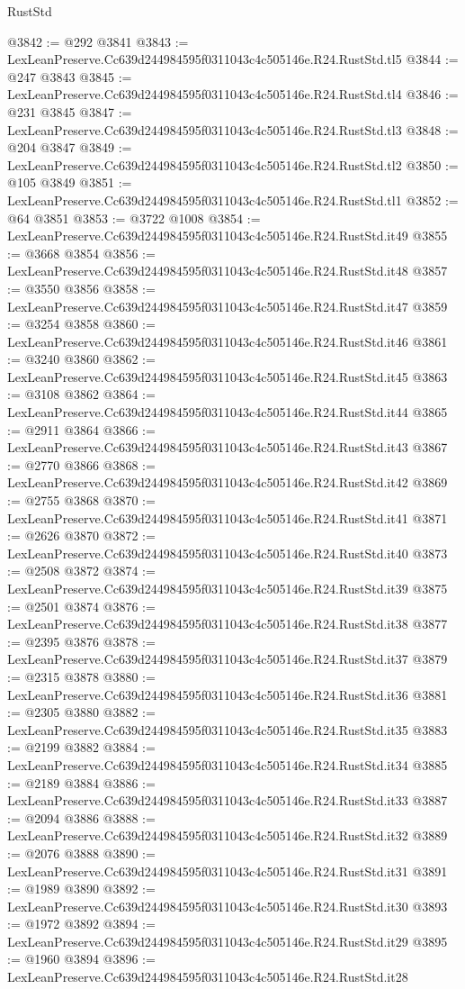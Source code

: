 \begin{lexlean}{RustStd}
\begin{coremodule}
@3842 := @292 @3841
@3843 := LexLeanPreserve.Cc639d244984595f0311043c4c505146e.R24.RustStd.tl5
@3844 := @247 @3843
@3845 := LexLeanPreserve.Cc639d244984595f0311043c4c505146e.R24.RustStd.tl4
@3846 := @231 @3845
@3847 := LexLeanPreserve.Cc639d244984595f0311043c4c505146e.R24.RustStd.tl3
@3848 := @204 @3847
@3849 := LexLeanPreserve.Cc639d244984595f0311043c4c505146e.R24.RustStd.tl2
@3850 := @105 @3849
@3851 := LexLeanPreserve.Cc639d244984595f0311043c4c505146e.R24.RustStd.tl1
@3852 := @64 @3851
@3853 := @3722 @1008
@3854 := LexLeanPreserve.Cc639d244984595f0311043c4c505146e.R24.RustStd.it49
@3855 := @3668 @3854
@3856 := LexLeanPreserve.Cc639d244984595f0311043c4c505146e.R24.RustStd.it48
@3857 := @3550 @3856
@3858 := LexLeanPreserve.Cc639d244984595f0311043c4c505146e.R24.RustStd.it47
@3859 := @3254 @3858
@3860 := LexLeanPreserve.Cc639d244984595f0311043c4c505146e.R24.RustStd.it46
@3861 := @3240 @3860
@3862 := LexLeanPreserve.Cc639d244984595f0311043c4c505146e.R24.RustStd.it45
@3863 := @3108 @3862
@3864 := LexLeanPreserve.Cc639d244984595f0311043c4c505146e.R24.RustStd.it44
@3865 := @2911 @3864
@3866 := LexLeanPreserve.Cc639d244984595f0311043c4c505146e.R24.RustStd.it43
@3867 := @2770 @3866
@3868 := LexLeanPreserve.Cc639d244984595f0311043c4c505146e.R24.RustStd.it42
@3869 := @2755 @3868
@3870 := LexLeanPreserve.Cc639d244984595f0311043c4c505146e.R24.RustStd.it41
@3871 := @2626 @3870
@3872 := LexLeanPreserve.Cc639d244984595f0311043c4c505146e.R24.RustStd.it40
@3873 := @2508 @3872
@3874 := LexLeanPreserve.Cc639d244984595f0311043c4c505146e.R24.RustStd.it39
@3875 := @2501 @3874
@3876 := LexLeanPreserve.Cc639d244984595f0311043c4c505146e.R24.RustStd.it38
@3877 := @2395 @3876
@3878 := LexLeanPreserve.Cc639d244984595f0311043c4c505146e.R24.RustStd.it37
@3879 := @2315 @3878
@3880 := LexLeanPreserve.Cc639d244984595f0311043c4c505146e.R24.RustStd.it36
@3881 := @2305 @3880
@3882 := LexLeanPreserve.Cc639d244984595f0311043c4c505146e.R24.RustStd.it35
@3883 := @2199 @3882
@3884 := LexLeanPreserve.Cc639d244984595f0311043c4c505146e.R24.RustStd.it34
@3885 := @2189 @3884
@3886 := LexLeanPreserve.Cc639d244984595f0311043c4c505146e.R24.RustStd.it33
@3887 := @2094 @3886
@3888 := LexLeanPreserve.Cc639d244984595f0311043c4c505146e.R24.RustStd.it32
@3889 := @2076 @3888
@3890 := LexLeanPreserve.Cc639d244984595f0311043c4c505146e.R24.RustStd.it31
@3891 := @1989 @3890
@3892 := LexLeanPreserve.Cc639d244984595f0311043c4c505146e.R24.RustStd.it30
@3893 := @1972 @3892
@3894 := LexLeanPreserve.Cc639d244984595f0311043c4c505146e.R24.RustStd.it29
@3895 := @1960 @3894
@3896 := LexLeanPreserve.Cc639d244984595f0311043c4c505146e.R24.RustStd.it28

\end{coremodule}
\end{lexlean}
